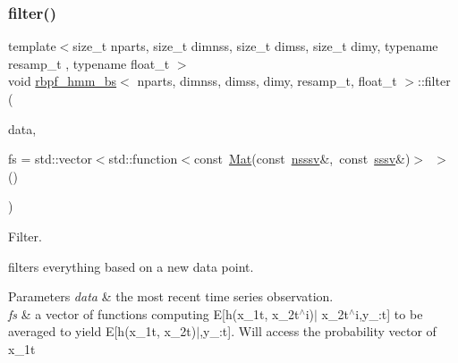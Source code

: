 \subsubsection{\texorpdfstring{filter()}{filter()}}
{\footnotesize\ttfamily template$<$size\+\_\+t nparts, size\+\_\+t dimnss, size\+\_\+t dimss, size\+\_\+t dimy, typename resamp\+\_\+t , typename float\+\_\+t $>$ \\
void \hyperlink{classrbpf__hmm__bs}{rbpf\+\_\+hmm\+\_\+bs}$<$ nparts, dimnss, dimss, dimy, resamp\+\_\+t, float\+\_\+t $>$\+::filter (\begin{DoxyParamCaption}\item[{const \hyperlink{classrbpf__hmm__bs_a6ec23f9c6eff96f8967c3c451c32b772}{osv} \&}]{data,  }\item[{const std\+::vector$<$ std\+::function$<$ const \hyperlink{classrbpf__hmm__bs_aa0bd79c7ece59908ed08c51da3d67dad}{Mat}(const \hyperlink{classrbpf__hmm__bs_a98c86f40e4ca55ff16156077b11032ca}{nsssv} \&x1t\+Probs, const \hyperlink{classrbpf__hmm__bs_a9a1c8d64f693a34a902dbfcb009d0f96}{sssv} \&x2t)$>$ $>$ \&}]{fs = {\ttfamily std\+:\+:vector$<$std\+:\+:function$<$const~\hyperlink{classrbpf__hmm__bs_aa0bd79c7ece59908ed08c51da3d67dad}{Mat}(const~\hyperlink{classrbpf__hmm__bs_a98c86f40e4ca55ff16156077b11032ca}{nsssv}\&,~const~\hyperlink{classrbpf__hmm__bs_a9a1c8d64f693a34a902dbfcb009d0f96}{sssv}\&)$>$~$>$()} }\end{DoxyParamCaption})}



Filter. 

filters everything based on a new data point. 
\begin{DoxyParams}{Parameters}
{\em data} & the most recent time series observation. \\
\hline
{\em fs} & a vector of functions computing E\mbox{[}h(x\+\_\+1t, x\+\_\+2t$^\wedge$i)$\vert$ x\+\_\+2t$^\wedge$i,y\+\_\+:t\mbox{]} to be averaged to yield E\mbox{[}h(x\+\_\+1t, x\+\_\+2t)$\vert$,y\+\_\+:t\mbox{]}. Will access the probability vector of x\+\_\+1t \\
\hline
\end{DoxyParams}
\mbox{\label{classrbpf__hmm__bs_a92d27356a7b42d57ad99e4778bdabdec}} 
